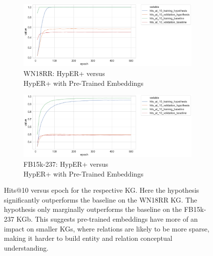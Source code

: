 \begin{figure}[H]
	\begin{subfigure}[b]{.5\linewidth}
   		\centering
    		\includegraphics[width=1.0\linewidth, height=0.6\linewidth]{WN18RR_hits_at_10_Results_ptwv}
		\captionsetup{justification=centering}
		\caption{WN18RR: HypER+ versus \\ HypER+ with Pre-Trained Embeddings}
	\end{subfigure}
	\begin{subfigure}[b]{.5\linewidth}
   		\centering
		\includegraphics[width=1.0\linewidth, height=0.6\linewidth]{FB15k-237_hits_at_10_Results_ptwv}
		\captionsetup{justification=centering}
		\caption{FB15k-237: HypER+ versus \\ HypER+ with Pre-Trained Embeddings}
	\end{subfigure}
	\captionsetup{justification=centering}
	\caption{Hits@10 versus epoch for the respective KG. Here the hypothesis significantly outperforms the baseline on the WN18RR KG. The hypothesis only marginally outperforms the baseline on the FB15k-237 KGb. This suggests pre-trained embeddings have more of an impact on smaller KGs, where relations are likely to be more sparse, making it harder to build entity and relation conceptual understanding.}
\end{figure}


